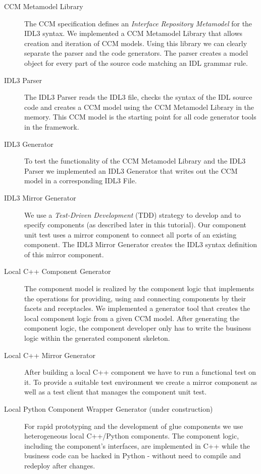\begin{description}
\item [CCM Metamodel Library]
The CCM specification defines an {\it Interface Repository Metamodel} for the
IDL3 syntax. We implemented a CCM Metamodel Library that allows creation and
iteration of CCM models. Using this library we can clearly separate the parser
and the code generators. The parser creates a model object for every part of the
source code matching an IDL grammar rule.

\item [IDL3 Parser]
The IDL3 Parser reads the IDL3 file, checks the syntax of the IDL source code
and creates a CCM model using the CCM Metamodel Library in the memory. This CCM
model is the starting point for all code generator tools in the framework.

\item [IDL3 Generator]
To test the functionality of the CCM Metamodel Library and the IDL3 Parser we implemented
an IDL3 Generator that writes out the CCM model in a corresponding IDL3 File.

\item [IDL3 Mirror Generator]
We use a {\it Test-Driven Development} (TDD) strategy to develop and to specify
components (as described later in this tutorial). Our component unit test uses a
mirror component to connect all ports of an existing component. The IDL3 Mirror
Generator creates the IDL3 syntax definition of this mirror component.

\item [Local C++ Component Generator]
The component model is realized by the component logic that implements the
operations for providing, using and connecting components by their facets and
receptacles. We implemented a generator tool that creates the local component
logic from a given CCM model. After generating the component logic, the
component developer only has to write the business logic within the generated
component skeleton.

\item [Local C++ Mirror Generator]
After building a local C++ component we have to run a functional test on it. To
provide a suitable test environment we create a mirror component as well as a
test client that manages the component unit test.

\item [Local Python Component Wrapper Generator (under construction)]
For rapid prototyping and the development of glue components we use
heterogeneous local C++/Python components. The component logic, including the
component's interfaces, are implemented in C++ while the business code can be
hacked in Python - without need to compile and redeploy after changes.


\end{description}
